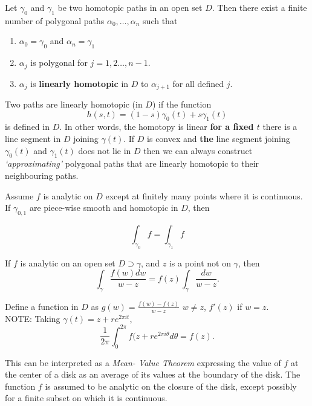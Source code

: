 \documentclass[10pt,a4paper]{book}
\begin{document}
\begin{Thm}
Let $\gamma_0$ and $\gamma_1$ be two homotopic paths in an open set $D$. Then there exist a finite number of polygonal paths $\alpha_0, \dots, \alpha_n$ such that
\begin{enumerate}
    \item $\alpha_0 = \gamma_0$ and $\alpha_{n} = \gamma_1$
    \item $\alpha_j$ is polygonal for $j = 1, 2 \dots, n-1$.
    \item $\alpha_j$ is \textbf{linearly homotopic} in $D$ to $\alpha_{j+1}$ for all defined $j$.
\end{enumerate}

\end{Thm}
\PP Two paths are linearly homotopic (in $D$) if the function
$$h(s,t) = (1-s)\gamma_0(t) + s\gamma_1(t)$$
is defined in $D$. In other words, the homotopy is linear \textbf{for a fixed $t$} there is a line segment in $D$ joining $\gamma(t)$. If $D$ is convex and \textbf{the} line segment joining $\gamma_0(t)$ and $\gamma_1(t)$ does not lie in $D$ then we can always construct \textit{`approximating'} polygonal paths that are linearly homotopic to their neighbouring paths.

\begin{Thm}
Assume $f$ is analytic on $D$ except at finitely many points where it is continuous. If $\gamma_{0,1}$ are piece-wise smooth and homotopic in $D$, then

$$\int_{\gamma_0} f = \int_{\gamma_1} f$$
\end{Thm}

\begin{Thm}
If $f$ is analytic on an open set $D \supset \gamma$, and $z$ is a point not on $\gamma$, then
$$\int_\gamma \dfrac{f(w) dw}{w-z} = f(z)\int_\gamma \dfrac{dw}{w-z}.$$
\end{Thm}
\PP Define a function in $D$ as $g(w) =\frac{f(w) - f(z)}{w-z}$ $w \neq z $, $f'(z)$ if $w = z$.\\

NOTE: Taking $\gamma(t)  = z + re^{2\pi it}$, 
$$\dfrac{1}{2\pi}\int_0^{2\pi} f(z+ re^{2\pi i \theta} d\theta = f(z).$$

This can be interpreted as a \textit{Mean- Value Theorem} expressing the value of $f$ at the center of a disk as an average of its values at the boundary of the disk. The function $f$ is assumed to be analytic on the closure of the disk, except possibly for a finite subset on which it is continuous.
\end{document}
